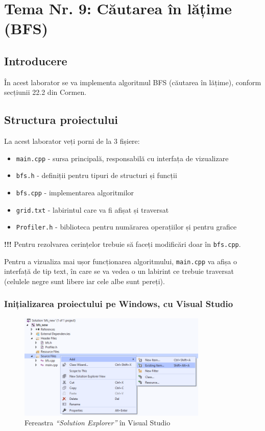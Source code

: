 \documentclass[../ro-fa-lab.tex]{subfiles}
\begin{document}
\section{\texorpdfstring{\textbf{Tema Nr. 9: Căutarea în lățime (BFS)}}{Tema Nr. 9: Căutarea în lățime (BFS)}}\label{assign9}


\subsection{Introducere}
În acest laborator se va implementa algoritmul BFS (căutarea în lățime), conform secțiunii 22.2 din Cormen.

\subsection{Structura proiectului}
La acest laborator veți porni de la 3 fișiere:
\begin{itemize}
    \item \texttt{main.cpp} - sursa principală, responsabilă cu interfața de vizualizare
    \item \texttt{bfs.h} - definiții pentru tipuri de structuri și funcții
    \item \texttt{bfs.cpp} - implementarea algoritmilor
    \item \texttt{grid.txt} - labirintul care va fi afișat și traversat
    \item \texttt{Profiler.h} - biblioteca pentru numărarea operațiilor și pentru grafice
\end{itemize}


\textbf{!!!} Pentru rezolvarea cerințelor trebuie să faceți modificări doar în \texttt{bfs.cpp}.

Pentru a vizualiza mai ușor funcționarea algoritmului, \texttt{main.cpp} va afișa o interfață de tip text, în care se va vedea o un labirint ce trebuie traversat (celulele negre sunt libere iar cele albe sunt pereți).

\subsubsection{Inițializarea proiectului pe Windows, cu Visual Studio}
\begin{figure}[h]
    \centering
    \includegraphics[width=9cm]{../Resources/lab9/vs_solution.png}
    \caption{Fereastra \textit{``Solution Explorer''} în Visual Studio}
    \label{fig:vs}
\end{figure}
\end{document}
